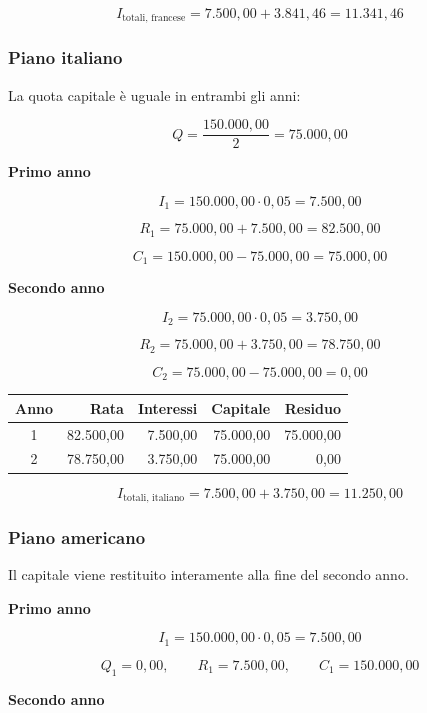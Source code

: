 \[
    I_{\text{totali, francese}}
    =
    7.500{,}00+3.841{,}46
    =
    11.341{,}46
\]

\subsubsection*{Piano italiano}

\noindent La quota capitale è uguale in entrambi gli anni:

\[
    Q=\frac{150.000{,}00}{2}=75.000{,}00
\]

\textbf{Primo anno}

\[
    I_1=150.000{,}00\cdot0{,}05=7.500{,}00
\]

\[
    R_1=75.000{,}00+7.500{,}00=82.500{,}00
\]

\[
    C_1=150.000{,}00-75.000{,}00=75.000{,}00
\]

\textbf{Secondo anno}

\[
    I_2=75.000{,}00\cdot0{,}05=3.750{,}00
\]

\[
    R_2=75.000{,}00+3.750{,}00=78.750{,}00
\]

\[
    C_2=75.000{,}00-75.000{,}00=0{,}00
\]

\begin{center}
    \begin{tabular}{crrrr}
        \hline
        Anno & Rata & Interessi & Capitale & Residuo \\
        \hline
        1 & 82.500,00 & 7.500,00 & 75.000,00 & 75.000,00 \\
        2 & 78.750,00 & 3.750,00 & 75.000,00 & 0,00 \\
        \hline
    \end{tabular}
\end{center}

\[
    I_{\text{totali, italiano}}
    =
    7.500{,}00+3.750{,}00
    =
    11.250{,}00
\]

\subsubsection*{Piano americano}

\noindent Il capitale viene restituito interamente alla fine
del secondo anno.

\textbf{Primo anno}

\[
    I_1=150.000{,}00\cdot0{,}05=7.500{,}00
\]

\[
    Q_1=0{,}00,
    \qquad R_1=7.500{,}00,
    \qquad C_1=150.000{,}00
\]

\textbf{Secondo anno}

